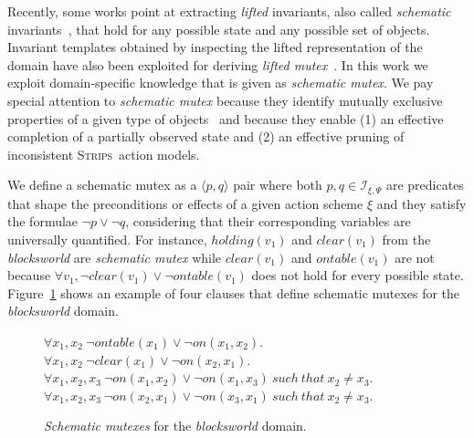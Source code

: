 \documentclass[letterpaper]{article} %
\newcommand{\tup}[1]{{\langle #1 \rangle}}
\newcommand{\strips}{\textsc{Strips}}     %
\begin{document}
Recently, some works point at extracting \emph{lifted} invariants, also called {\em schematic} invariants~\cite{rintanen:schematicInvariants:AAAI2017}, that hold for any possible state and any possible set of objects. Invariant
templates obtained by inspecting the lifted representation of the domain have also been exploited for deriving \emph{lifted mutex}~\cite{BernardiniFS18}. In this work we exploit domain-specific knowledge that is given as {\em schematic mutex}. We pay special attention to {\em schematic mutex} because they identify mutually exclusive properties of a given type of objects~\cite{fox:TIM:JAIR1998} and because they enable (1) an effective completion of a partially observed state and (2) an effective pruning of inconsistent \strips\ action models.


We define a schematic mutex as a $\tup{p,q}$ pair where both $p,q\in{\mathcal I}_{\xi,\Psi}$ are predicates that shape the preconditions or effects of a given action scheme $\xi$ and they satisfy the formulae $\neg p\vee \neg q$, considering that their corresponding variables are universally quantified. For instance, $holding(v_1)$ and $clear(v_1)$ from the {\em blocksworld} are {\em schematic mutex} while $clear(v_1)$ and $ontable(v_1)$ are not because $\forall v_1, \neg clear(v_1)\vee\neg ontable(v_1)$ does not hold for every possible state. Figure~\ref{fig:strongest-invariant} shows an example of four clauses that define schematic mutexes for the {\em blocksworld} domain.

\begin{figure}[hbt!]
  \begin{footnotesize}
$\forall x_1,x_2\ \neg ontable(x_1)\vee\neg on(x_1,x_2)$.\\
$\forall x_1,x_2\ \neg clear(x_1)\vee\neg on(x_2,x_1)$.\\
$\forall x_1,x_2,x_3\ \neg on(x_1,x_2)\vee\neg on(x_1,x_3)\ such\ that\ x_2\neq x_3$.\\
$\forall x_1,x_2,x_3\ \neg on(x_2,x_1)\vee\neg on(x_3,x_1)\ such\ that\ x_2\neq x_3$.\\
\end{footnotesize}
 \caption{\small {\em Schematic mutexes} for the {\em blocksworld} domain.}
\label{fig:strongest-invariant}
\end{figure}
\end{document}
